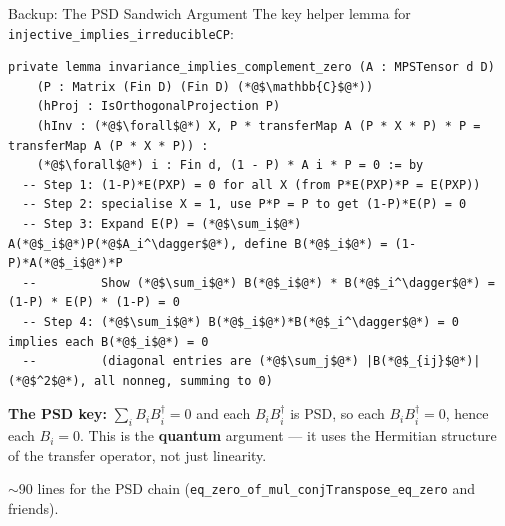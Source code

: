 \documentclass[aspectratio=169,10pt]{beamer}
\begin{document}
\begin{frame}[fragile]{Backup: The PSD Sandwich Argument}
\vspace{-0.5em}
{\small The key helper lemma for \texttt{injective\_implies\_irreducibleCP}:}

\vspace{0.1em}
\begin{lstlisting}[basicstyle=\ttfamily\fontsize{4.5}{5.5}\selectfont\color{white}]
private lemma invariance_implies_complement_zero (A : MPSTensor d D)
    (P : Matrix (Fin D) (Fin D) (*@$\mathbb{C}$@*))
    (hProj : IsOrthogonalProjection P)
    (hInv : (*@$\forall$@*) X, P * transferMap A (P * X * P) * P = transferMap A (P * X * P)) :
    (*@$\forall$@*) i : Fin d, (1 - P) * A i * P = 0 := by
  -- Step 1: (1-P)*E(PXP) = 0 for all X (from P*E(PXP)*P = E(PXP))
  -- Step 2: specialise X = 1, use P*P = P to get (1-P)*E(P) = 0
  -- Step 3: Expand E(P) = (*@$\sum_i$@*) A(*@$_i$@*)P(*@$A_i^\dagger$@*), define B(*@$_i$@*) = (1-P)*A(*@$_i$@*)*P
  --         Show (*@$\sum_i$@*) B(*@$_i$@*) * B(*@$_i^\dagger$@*) = (1-P) * E(P) * (1-P) = 0
  -- Step 4: (*@$\sum_i$@*) B(*@$_i$@*)*B(*@$_i^\dagger$@*) = 0 implies each B(*@$_i$@*) = 0
  --         (diagonal entries are (*@$\sum_j$@*) |B(*@$_{ij}$@*)|(*@$^2$@*), all nonneg, summing to 0)
\end{lstlisting}

\vspace{0.2em}
{\small\textbf{The PSD key:} $\sum_i B_i B_i^\dagger = 0$ and each $B_i B_i^\dagger$ is PSD, so each $B_i B_i^\dagger = 0$, hence each $B_i = 0$.
This is the \textbf{quantum} argument --- it uses the Hermitian structure
of the transfer operator, not just linearity.}

\vspace{0.1em}
{\small $\sim$90 lines for the PSD chain (\texttt{eq\_zero\_of\_mul\_conjTranspose\_eq\_zero} and friends).}
\end{frame}
\end{document}
